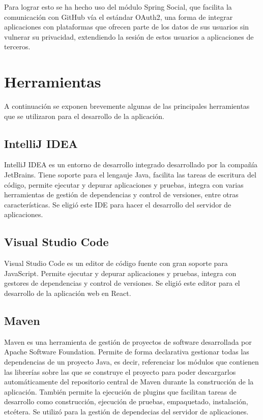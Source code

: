 \documentclass[a4paper, 12pt]{book}
\begin{document}
Para lograr esto se ha hecho uso del módulo Spring Social, que facilita la comunicación con GitHub vía el estándar OAuth2, una forma de integrar aplicaciones con plataformas que ofrecen parte de los datos de sus usuarios sin vulnerar su privacidad, extendiendo la sesión de estos usuarios a aplicaciones de terceros.


\section{Herramientas}
\label{sec:intro_tools}
A continuación se exponen brevemente algunas de las principales herramientas que se utilizaron para el desarrollo de la aplicación.

\subsection{IntelliJ IDEA}
\label{subsec:intro_tools_intellij}
IntelliJ IDEA es un entorno de desarrollo integrado desarrollado por la compañía JetBrains. Tiene soporte para el lengauje Java, facilita las tareas de escritura del código, permite ejecutar y depurar aplicaciones y pruebas, integra con varias herramientas de gestión de dependencias y control de versiones, entre otras características. Se eligió este IDE para hacer el desarrollo del servidor de aplicaciones.

\subsection{Visual Studio Code}
\label{subsec:intro_tools_vsc}
Visual Studio Code es un editor de código fuente con gran soporte para JavaScript. Permite ejecutar y depurar aplicaciones y pruebas, integra con gestores de dependencias y control de versiones. Se eligió este editor para el desarrollo de la aplicación web en React.

\subsection{Maven}
\label{subsec:intro_tools_maven}
Maven es una herramienta de gestión de proyectos de software desarrollada por Apache Software Foundation. Permite de forma declarativa gestionar todas las dependencias de un proyecto Java, es decir, referenciar los módulos que contienen las librerías sobre las que se construye el proyecto para poder descargarlos automáticamente del repositorio central de Maven
durante la construcción de la aplicación. También permite la ejecución de plugins que facilitan tareas de desarrollo como construcción, ejecución de pruebas, empaquetado, instalación, etcétera. Se utilizó para la gestión de dependecias del servidor de aplicaciones.
\end{document}
